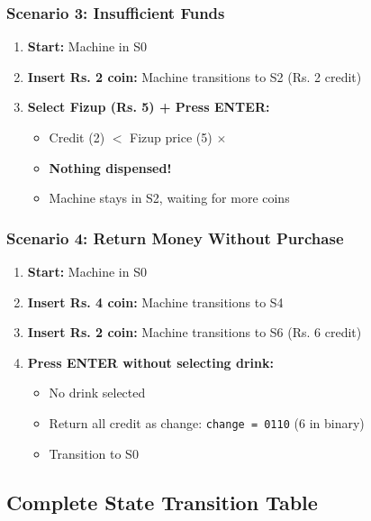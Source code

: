 \documentclass[12pt,a4paper]{article}
\begin{document}
\subsubsection{Scenario 3: Insufficient Funds}
\begin{enumerate}
    \item \textbf{Start:} Machine in S0
    \item \textbf{Insert Rs. 2 coin:} Machine transitions to S2 (Rs. 2 credit)
    \item \textbf{Select Fizup (Rs. 5) + Press ENTER:}
    \begin{itemize}
        \item Credit (2) $<$ Fizup price (5) $\times$
        \item \textbf{Nothing dispensed!}
        \item Machine stays in S2, waiting for more coins
    \end{itemize}
\end{enumerate}

\subsubsection{Scenario 4: Return Money Without Purchase}
\begin{enumerate}
    \item \textbf{Start:} Machine in S0
    \item \textbf{Insert Rs. 4 coin:} Machine transitions to S4
    \item \textbf{Insert Rs. 2 coin:} Machine transitions to S6 (Rs. 6 credit)
    \item \textbf{Press ENTER without selecting drink:}
    \begin{itemize}
        \item No drink selected
        \item Return all credit as change: \texttt{change = 0110} (6 in binary)
        \item Transition to S0
    \end{itemize}
\end{enumerate}

\subsection{Complete State Transition Table}
\end{document}
